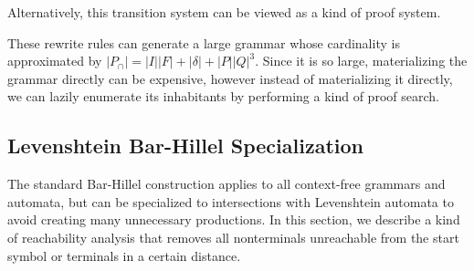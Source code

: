 \documentclass[sigplan,review,anonymous,acmsmall]{acmart}\settopmatter{printfolios=false,printccs=false,printacmref=false}
\begin{document}
  \noindent Alternatively, this transition system can be viewed as a kind of proof system.


  \noindent These rewrite rules can generate a large grammar whose cardinality is approximated by $|P_\cap|=|I||F| + |\delta| + |P||Q|^3$. Since it is so large, materializing the grammar directly can be expensive, however instead of materializing it directly, we can lazily enumerate its inhabitants by performing a kind of proof search.

  \subsection{Levenshtein Bar-Hillel Specialization}

  The standard Bar-Hillel construction applies to all context-free grammars and automata, but can be specialized to intersections with Levenshtein automata to avoid creating many unnecessary productions. In this section, we describe a kind of reachability analysis that removes all nonterminals unreachable from the start symbol or terminals in a certain distance.
\end{document}
